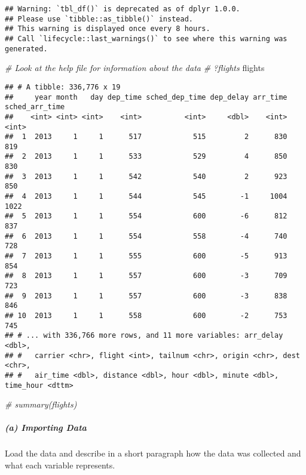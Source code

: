 \documentclass[
]{article}
\newenvironment{Shaded}{\begin{snugshade}}{\end{snugshade}}
\newcommand{\CommentTok}[1]{\textcolor[rgb]{0.56,0.35,0.01}{\textit{#1}}}
\newcommand{\NormalTok}[1]{#1}
\begin{document}
\begin{verbatim}
## Warning: `tbl_df()` is deprecated as of dplyr 1.0.0.
## Please use `tibble::as_tibble()` instead.
## This warning is displayed once every 8 hours.
## Call `lifecycle::last_warnings()` to see where this warning was generated.
\end{verbatim}

\begin{Shaded}
\begin{Highlighting}[]
\CommentTok{# Look at the help file for information about the data}
\CommentTok{# ?flights}
\NormalTok{flights}
\end{Highlighting}
\end{Shaded}

\begin{verbatim}
## # A tibble: 336,776 x 19
##     year month   day dep_time sched_dep_time dep_delay arr_time sched_arr_time
##    <int> <int> <int>    <int>          <int>     <dbl>    <int>          <int>
##  1  2013     1     1      517            515         2      830            819
##  2  2013     1     1      533            529         4      850            830
##  3  2013     1     1      542            540         2      923            850
##  4  2013     1     1      544            545        -1     1004           1022
##  5  2013     1     1      554            600        -6      812            837
##  6  2013     1     1      554            558        -4      740            728
##  7  2013     1     1      555            600        -5      913            854
##  8  2013     1     1      557            600        -3      709            723
##  9  2013     1     1      557            600        -3      838            846
## 10  2013     1     1      558            600        -2      753            745
## # ... with 336,766 more rows, and 11 more variables: arr_delay <dbl>,
## #   carrier <chr>, flight <int>, tailnum <chr>, origin <chr>, dest <chr>,
## #   air_time <dbl>, distance <dbl>, hour <dbl>, minute <dbl>, time_hour <dttm>
\end{verbatim}

\begin{Shaded}
\begin{Highlighting}[]
\CommentTok{# summary(flights)}
\end{Highlighting}
\end{Shaded}

\hypertarget{a-importing-data}{%
\subparagraph{(a) Importing Data}\label{a-importing-data}}

Load the data and describe in a short paragraph how the data was
collected and what each variable represents.
\end{document}
